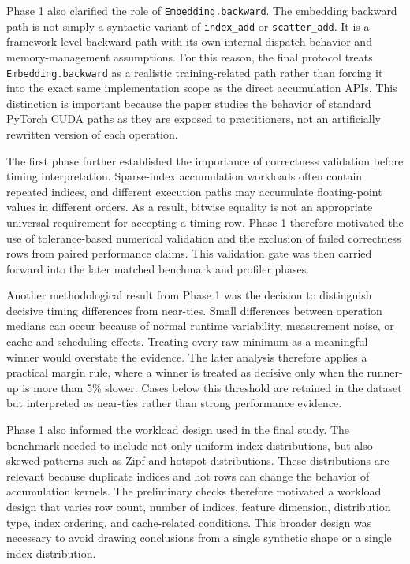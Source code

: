 Phase 1 also clarified the role of \texttt{Embedding.backward}. The embedding backward path is not simply a syntactic variant of \texttt{index\_add} or \texttt{scatter\_add}. It is a framework-level backward path with its own internal dispatch behavior and memory-management assumptions. For this reason, the final protocol treats \texttt{Embedding.backward} as a realistic training-related path rather than forcing it into the exact same implementation scope as the direct accumulation APIs. This distinction is important because the paper studies the behavior of standard PyTorch CUDA paths as they are exposed to practitioners, not an artificially rewritten version of each operation.

The first phase further established the importance of correctness validation before timing interpretation. Sparse-index accumulation workloads often contain repeated indices, and different execution paths may accumulate floating-point values in different orders. As a result, bitwise equality is not an appropriate universal requirement for accepting a timing row. Phase 1 therefore motivated the use of tolerance-based numerical validation and the exclusion of failed correctness rows from paired performance claims. This validation gate was then carried forward into the later matched benchmark and profiler phases.

Another methodological result from Phase 1 was the decision to distinguish decisive timing differences from near-ties. Small differences between operation medians can occur because of normal runtime variability, measurement noise, or cache and scheduling effects. Treating every raw minimum as a meaningful winner would overstate the evidence. The later analysis therefore applies a practical margin rule, where a winner is treated as decisive only when the runner-up is more than 5\% slower. Cases below this threshold are retained in the dataset but interpreted as near-ties rather than strong performance evidence.

Phase 1 also informed the workload design used in the final study. The benchmark needed to include not only uniform index distributions, but also skewed patterns such as Zipf and hotspot distributions. These distributions are relevant because duplicate indices and hot rows can change the behavior of accumulation kernels. The preliminary checks therefore motivated a workload design that varies row count, number of indices, feature dimension, distribution type, index ordering, and cache-related conditions. This broader design was necessary to avoid drawing conclusions from a single synthetic shape or a single index distribution.

